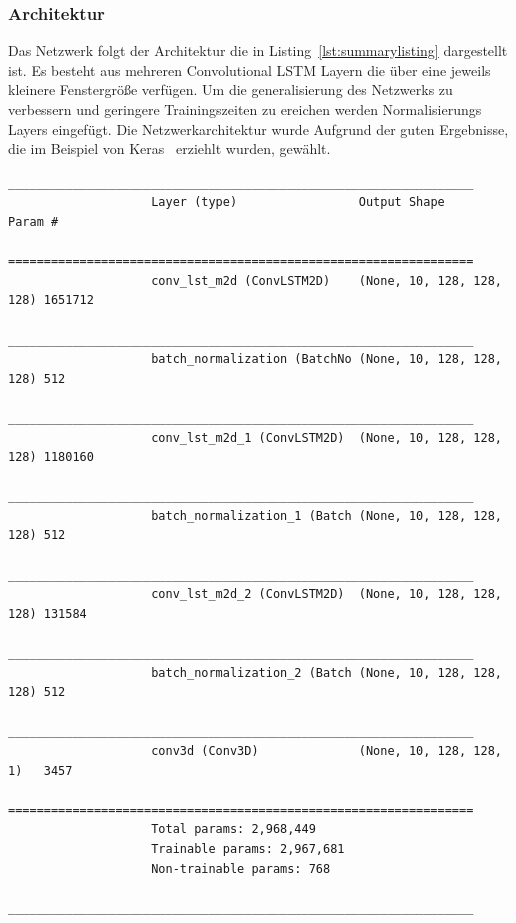 \documentclass[12pt]{article}
\begin{document}
        \subsubsection{Architektur}
            Das Netzwerk folgt der Architektur die in Listing~\ref{lst:summarylisting} dargestellt ist. Es besteht aus mehreren Convolutional LSTM Layern die über eine jeweils kleinere Fenstergröße verfügen.
            Um die generalisierung des Netzwerks zu verbessern und geringere Trainingszeiten zu ereichen werden Normalisierungs Layers eingefügt. 
            Die Netzwerkarchitektur wurde Aufgrund der guten Ergebnisse, die im Beispiel von Keras~\cite{Keras2021} erziehlt wurden, gewählt.
            \begin{lstlisting}[caption=Ausgabe des model.summary() Aufrufs, label={lst:summarylisting}, basicstyle=\tiny, numbers=none]
                    _________________________________________________________________
                    Layer (type)                 Output Shape              Param #   
                    =================================================================
                    conv_lst_m2d (ConvLSTM2D)    (None, 10, 128, 128, 128) 1651712   
                    _________________________________________________________________
                    batch_normalization (BatchNo (None, 10, 128, 128, 128) 512       
                    _________________________________________________________________
                    conv_lst_m2d_1 (ConvLSTM2D)  (None, 10, 128, 128, 128) 1180160   
                    _________________________________________________________________
                    batch_normalization_1 (Batch (None, 10, 128, 128, 128) 512       
                    _________________________________________________________________
                    conv_lst_m2d_2 (ConvLSTM2D)  (None, 10, 128, 128, 128) 131584    
                    _________________________________________________________________
                    batch_normalization_2 (Batch (None, 10, 128, 128, 128) 512       
                    _________________________________________________________________
                    conv3d (Conv3D)              (None, 10, 128, 128, 1)   3457      
                    =================================================================
                    Total params: 2,968,449
                    Trainable params: 2,967,681
                    Non-trainable params: 768
                    _________________________________________________________________
            \end{lstlisting}
\end{document}
